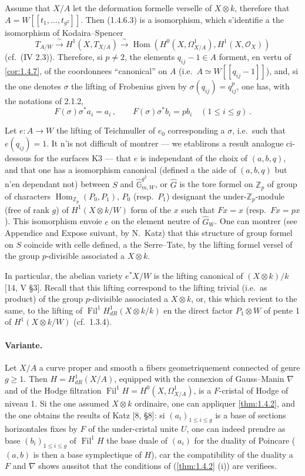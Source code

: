 \documentclass[12pt,a4paper]{article}
\theoremstyle{plain}
\theoremstyle{definition}
\theoremstyle{remark}
\DeclareMathOperator{\Hom}{Hom}
\DeclareMathOperator{\Fil}{Fil}
\begin{document}
Assume that $X/A$ let the deformation formelle verselle of $X \otimes k$, therefore that $A = W[[t_1, \ldots, t_{g^2}]]$. Then (1.4.6.3) is a isomorphism, which s'identifie a the isomorphism of Kodaira--Spencer
\[
T_{A/W} \xrightarrow{\;\sim\;} H^1(X, T_{X/A}) \xrightarrow{\;\sim\;} \Hom(H^0(X, \Omega_{X/A}^1), H^1(X, \mathcal{O}_X))
\]
(cf.\ (IV 2.3)). Therefore, si $p \neq 2$, the elements $q_{ij} - 1 \in A$ forment, en vertu of \ref{cor:1.4.7}, of the coordonnees ``canonical'' on $A$ (i.e.\ $A \simeq W[[q_{ij} - 1]]$), and, si the one denotes $\sigma$ the lifting of Frobenius given by $\sigma(q_{ij}) = q_{ij}^p$, one has, with the notations of 2.1.2,
\[
F(\sigma)\sigma^*a_i = a_i\,, \qquad F(\sigma)\sigma^*b_i = pb_i \quad (1 \leq i \leq g)\,.\]

Let $e : A \to W$ the lifting of Teichmuller of $e_0$ corresponding a $\sigma$, i.e.\ such that $e(q_{ij}) = 1$. It n'is not difficult of montrer --- we etablirons a result analogue ci-dessous for the surfaces K3 --- that $e$ is independant of the choix of $(a, b, q)$, and that one has a isomorphism canonical (defined a the aide of $(a, b, q)$ but n'en dependant not) between $S$ and $\widehat{\mathbb{G}}_{m,W}^{g^2}$, or $\widehat{G}$ is the tore formel on $\mathbb{Z}_p$ of group of characters $\Hom_{\mathbb{Z}_p}(P_0, P_1)$, $P_0$ (resp.\ $P_1$) designant the under-$\mathbb{Z}_p$-module (free of rank $g$) of $H^1(X \otimes k/W)$ form of the $x$ such that $Fx = x$ (resp.\ $Fx = px$). This isomorphism envoie $e$ on the element neutre of $\widehat{G}_W$. One can montrer (see Appendice and Expose suivant, by N.\ Katz) that this structure of group formel on $S$ coincide with celle defined, a the Serre--Tate, by the lifting formel versel of the group $p$-divisible associated a $X \otimes k$.

In particular, the abelian variety $e^*X/W$ is the lifting canonical of $(X \otimes k)/k$ [14, V \S 3]. Recall that this lifting correspond to the lifting trivial (i.e.\ as product) of the group $p$-divisible associated a $X \otimes k$, or, this which revient to the same, to the lifting of $\Fil^1H_{dR}^1(X \otimes k/k)$ en the direct factor $P_1 \otimes W$ of pente 1 of $H^1(X \otimes k/W)$ (cf.\ 1.3.4).

\paragraph{Variante.}

Let $X/A$ a curve proper and smooth a fibers geometriquement connected of genre $g \geq 1$. Then $H = H_{dR}^1(X/A)$, equipped with the connexion of Gauss--Manin $\nabla$ and of the Hodge filtration $\Fil^1H = H^0(X, \Omega_{X/A}^1)$, is a $F$-cristal of Hodge of niveau 1. Si the one assumed $X \otimes k$ ordinaire, one can appliquer \ref{thm:1.4.2}, and the one obtains the results of Katz [8, \S 8]: si $(a_i)_{1 \leq i \leq g}$ is a base of sections horizontales fixes by $F$ of the under-cristal unite $U$, one can indeed prendre as base $(b_i)_{1 \leq i \leq g}$ of $\Fil^1H$ the base duale of $(a_i)$ for the duality of Poincare ($(a,b)$ is then a base symplectique of $H$), car the compatibility of the duality a $F$ and $\nabla$ shows aussitot that the conditions of (\ref{thm:1.4.2} (i)) are verifiees.
\end{document}
